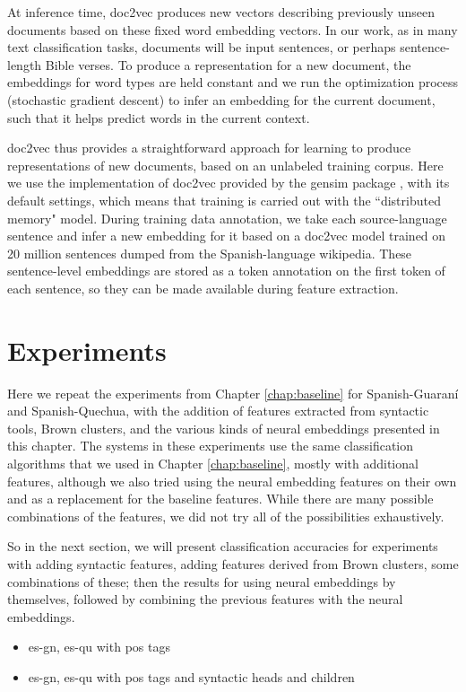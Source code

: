 At inference time, doc2vec produces new vectors describing previously unseen
documents based on these fixed word embedding vectors. In our work, as in many
text classification tasks, documents will be input sentences, or perhaps
sentence-length Bible verses. To produce a representation for a new document,
the embeddings for word types are held constant and we run the optimization
process (stochastic gradient descent) to infer an embedding for the current
document, such that it helps predict words in the current context.

doc2vec thus provides a straightforward approach for learning to produce
representations of new documents, based on an unlabeled training corpus. Here
we use the implementation of doc2vec provided by the gensim package
\cite{rehurek-lrec}, with its default settings, which means that training is
carried out with the ``distributed memory" model.
During training data annotation, we take each source-language sentence and
infer a new embedding for it based on a doc2vec model trained on 20 million
sentences dumped from the Spanish-language wikipedia. These sentence-level
embeddings are stored as a token annotation on the first token of each
sentence, so they can be made available during feature extraction.

\section{Experiments}
\label{sec:monolingual-experiments}
Here we repeat the experiments from Chapter \ref{chap:baseline} for
Spanish-Guaraní and Spanish-Quechua, with the addition of features extracted
from syntactic tools, Brown clusters, and the various kinds of neural
embeddings presented in this chapter.
The systems in these experiments use the same classification algorithms that we
used in Chapter \ref{chap:baseline}, mostly with additional features, although
we also tried using the neural embedding features on their own and as a
replacement for the baseline features. While there are many possible
combinations of the features, we did not try all of the possibilities
exhaustively.

So in the next section, we will present classification accuracies for
experiments with adding syntactic features, adding features derived from Brown
clusters, some combinations of these; then the results for using neural
embeddings by themselves, followed by combining the previous features with the
neural embeddings.

\begin{itemize}
  \item es-gn, es-qu with pos tags
  \item es-gn, es-qu with pos tags and syntactic heads and children
\end{itemize}

